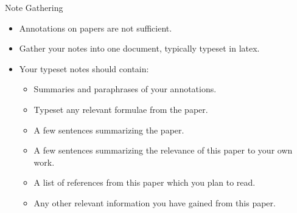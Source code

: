 \documentclass[handout]{beamer}
\begin{document}
\begin{frame}{Note Gathering}
    \begin{itemize}
        \item Annotations on papers are not sufficient.
        \item Gather your notes into one document, typically typeset in latex.
        \item Your typeset notes should contain:
        \begin{itemize}
            \item Summaries and paraphrases of your annotations.
            \item Typeset any relevant formulae from the paper.
            \item A few sentences summarizing the paper.
            \item A few sentences summarizing the relevance of this paper to your own work.
            \item A list of references from this paper which you plan to read.
            \item Any other relevant information you have gained from this paper.
        \end{itemize}
    \end{itemize}
\end{frame}
\end{document}

